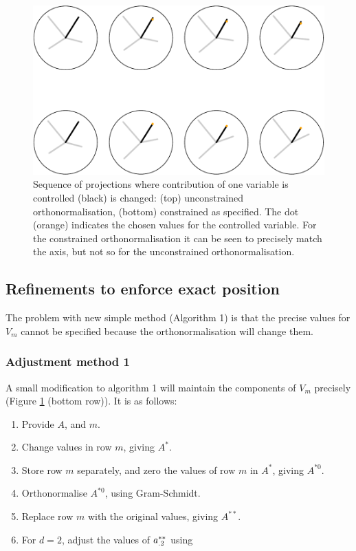 \documentclass[]{interact}
\theoremstyle{plain}%
\theoremstyle{definition}
\theoremstyle{remark}
\providecommand{\tightlist}{%
  \setlength{\itemsep}{0pt}\setlength{\parskip}{0pt}}
\def\tightlist{}
\begin{document}
\begin{figure}
\includegraphics[width=1\linewidth]{paper_files/figure-latex/manualsequence-1} \caption{Sequence of projections where contribution of one variable is controlled (black) is changed: (top) unconstrained orthonormalisation, (bottom) constrained as specified. The dot (orange) indicates the chosen values for the controlled variable. For the constrained orthonormalisation it can be seen to precisely match the axis, but not so for the unconstrained orthonormalisation.}\label{fig:manualsequence}
\end{figure}

\hypertarget{refinements-to-enforce-exact-position}{%
\subsection{Refinements to enforce exact
position}\label{refinements-to-enforce-exact-position}}

The problem with new simple method (Algorithm 1) is that the precise
values for \(V_m\) cannot be specified because the orthonormalisation
will change them.

\hypertarget{adjustment-method-1}{%
\subsubsection{Adjustment method 1}\label{adjustment-method-1}}

A small modification to algorithm 1 will maintain the components of
\(V_m\) precisely (Figure \ref{fig:manualsequence} (bottom row)). It is
as follows:

\begin{enumerate}
\def\labelenumi{\arabic{enumi}.}
\tightlist
\item
  Provide \(A\), and \(m\).
\item
  Change values in row \(m\), giving \(A^*\).
\item
  Store row \(m\) separately, and zero the values of row \(m\) in
  \(A^*\), giving \(A^{*0}\).
\item
  Orthonormalise \(A^{*0}\), using Gram-Schmidt.
\item
  Replace row \(m\) with the original values, giving \(A^{**}\).
\item
  For \(d=2\), adjust the values of \({\boldmath a}^{**}_{.2}\) using
\end{enumerate}
\end{document}
